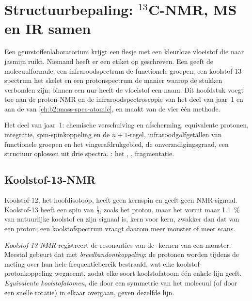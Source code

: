 \chapter{Structuurbepaling: \texorpdfstring{$^{13}$C}{13C}-NMR, MS en IR samen}\label{ch:b2:structure-determination}

Een geurstoffenlaboratorium krijgt een flesje met een kleurloze vloeistof die naar jasmijn ruikt. Niemand heeft
er een etiket op geschreven. Een  geeft de molecuulformule, een infraroodspectrum de functionele
groepen, een koolstof-13-spectrum het skelet en een protonspectrum de manier waarop de stukken verbonden zijn; binnen een
uur heeft de vloeistof een naam. Dit hoofdstuk voegt  toe aan de proton-NMR en de infraroodspectroscopie
van het deel van jaar~1 en aan de  van \cref{ch:b2:mass-spec-atomic}, en maakt van de vier
één methode.

\begin{recall}
Het deel van jaar~1: chemische verschuiving en afscherming, equivalente protonen, integratie, spin-spinkoppeling
en de $n + 1$-regel, infraroodgolfgetallen van functionele groepen en het vingerafdrukgebied, de
onverzadigingsgraad, een structuur oplossen uit drie spectra. : het
, , fragmentatie.
\end{recall}

\section{Koolstof-13-NMR}

Koolstof-12, het hoofdisotoop, heeft geen kernspin en geeft geen NMR-signaal. Koolstof-13 heeft een spin van
$\tfrac12$, zoals het proton, maar het vormt maar 1.1~\% van natuurlijke koolstof en zijn signaal is, kern voor kern,
zwakker dan dat van een proton; een koolstofspectrum vraagt daarom meer monster of meer scans.

\begin{definition}\label{def:b2:structure-determination:c13}
\emph{Koolstof-13-NMR} registreert de resonanties van de -kernen van een monster.
Meestal gebeurt dat met \emph{breedbandontkoppeling}: de protonen worden
tijdens de meting over hun hele frequentiebereik bestraald, wat elke
koolstof-protonkoppeling wegneemt, zodat elke soort koolstofatoom één enkele lijn geeft. \emph{Equivalente
koolstofatomen}, die door een symmetrie van het molecuul (of door een snelle rotatie) in elkaar overgaan,
geven dezelfde lijn.
\end{definition}


